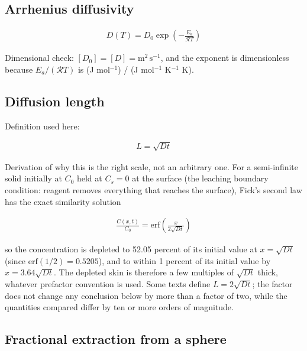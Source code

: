 \documentclass[10pt,a4paper,twoside]{report}
\begin{document}
\subsection*{Arrhenius diffusivity}

\begin{equation*}
\begin{gathered}
D(T) = D_0 \exp\!\left(-\frac{E_a}{\mathcal{R} T}\right)
\end{gathered}
\end{equation*}

Dimensional check: $[D_0] = [D] = \mathrm{m^2\,s^{-1}}$, and the exponent is dimensionless because $E_a/(\mathcal{R}T)$ is (J mol$^{-1}$) / (J mol$^{-1}$ K$^{-1}$ K).

\subsection*{Diffusion length}

Definition used here:

\begin{equation*}
\begin{gathered}
L = \sqrt{D t}
\end{gathered}
\end{equation*}

Derivation of why this is the right scale, not an arbitrary one. For a semi-infinite solid initially at $C_0$ held at $C_s = 0$ at the surface (the leaching boundary condition: reagent removes everything that reaches the surface), Fick's second law has the exact similarity solution

\begin{equation*}
\begin{gathered}
\frac{C(x,t)}{C_0} = \mathrm{erf}\!\left(\frac{x}{2\sqrt{Dt}}\right)
\end{gathered}
\end{equation*}

so the concentration is depleted to 52.05 percent of its initial value at $x = \sqrt{Dt}$ (since $\mathrm{erf}(1/2) = 0.5205$), and to within 1 percent of its initial value by $x = 3.64\sqrt{Dt}$. The depleted skin is therefore a few multiples of $\sqrt{Dt}$ thick, whatever prefactor convention is used. Some texts define $L = 2\sqrt{Dt}$; the factor does not change any conclusion below by more than a factor of two, while the quantities compared differ by ten or more orders of magnitude.

\subsection*{Fractional extraction from a sphere}
\end{document}
